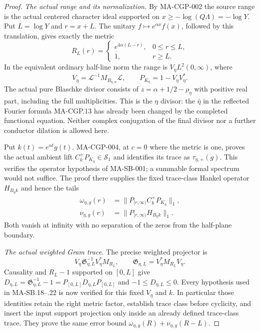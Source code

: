 \begin{proof}
\emph{The actual range and its normalization.}
By MA-CGP-002 the source range is the actual centered
character ideal supported on
$x\ge-\log(Q\Lambda)=-\log Y$.
Put $L=\log Y$ and $r=x+L$.
The unitary $f\mapsto e^{\alpha x}f(x)$, followed by
this translation, gives exactly the metric
\[
 R_L(r)=
 \begin{cases}e^{4\alpha(L-r)},&0\le r\le L,\\
 1,&r\ge L.
 \end{cases}
 \tag{MA-SB.34}
\]
In the equivalent ordinary half-line norm the range is
$V_\eta L^2(0,\infty)$, where
\[
 V_\eta=\mathcal L^{-1}M_{B_{\eta,\alpha}}\mathcal L,
 \qquad P_{K_\eta}=1-V_\eta V_\eta^*.
 \tag{MA-SB.35}
\]
The actual pure Blaschke divisor consists of
$z=\alpha+1/2-\rho_\eta$ with positive real part,
including the full multiplicities.  This is the
$\eta$ divisor: the $\bar\eta$ in the reflected
Fourier formula MA-CGP.13 has already been changed
by the completed functional equation.  Neither
complex conjugation of the final divisor nor a
further conductor dilation is allowed here.

Put $k(t)=e^{\alpha t}g(t)$.
MA-CGP-004, at $c=0$ where the metric is one, proves
the actual ambient lift
$C_k^+P_{K_\eta}\in\mathcal S_1$ and identifies its
trace as $\tau_{\eta,+}(g)$.
This verifies the operator hypothesis of MA-SB-001;
a summable formal spectrum would not suffice.
The proof there supplies the fixed trace-class
Hankel operator $H_{B_\eta k}$ and hence the tails
\[
 \begin{aligned}
 \omega_{\eta,g}(r)&=
       \|P_{[r,\infty)}C_k^+P_{K_\eta}\|_1,\\
 \nu_{\eta,g}(r)&=
       \|P_{[r,\infty)}H_{B_\eta k}\|_1.
\end{aligned}
 \tag{MA-SB.36}
\]
Both vanish at infinity with no separation of the
zeros from the half-plane boundary.

\emph{The actual weighted Gram trace.}
The precise weighted projector is
\[
 V_\eta\mathfrak G_{\eta,L}^{-1}V_\eta^*M_{R_L},
 \qquad
 \mathfrak G_{\eta,L}=V_\eta^*M_{R_L}V_\eta .
 \tag{MA-SB.37}
\]
Causality and $R_L-1$ supported on $[0,L]$ give
$D_{\eta,L}=\mathfrak G_{\eta,L}^{-1}-1
 =P_{[0,L]}D_{\eta,L}P_{[0,L]}$ and
$-1\le D_{\eta,L}\le0$.
Every hypothesis used in MA-SB.18--.22 is now
verified for this fixed $V_\eta$ and $k$.
In particular those identities retain the right
metric factor, establish trace class before
cyclicity, and insert the input support projection
only inside an already defined trace-class trace.
They prove the same error bound
$\omega_{\eta,g}(R)+\nu_{\eta,g}(R-L)$.


\end{proof}
